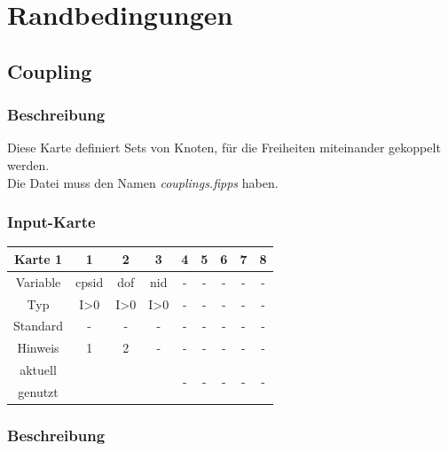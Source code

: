 \documentclass[11pt,titlepage,listof=totoc,bibliography=totoc,twoside]{scrreprt}
\begin{document}
{{\newpage

\section{Randbedingungen}

\subsection{Coupling}

\subsubsection{Beschreibung}

Diese Karte definiert Sets von Knoten, für die Freiheiten miteinander gekoppelt werden.\\
Die Datei muss den Namen \emph{couplings.fipps} haben.

\subsubsection{Input-Karte}

\begin{table}[htbp]
\centering
\begin{tabularx}{\textwidth}{cCCCCCCCC}
\toprule
Karte 1	& 1		& 2		& 3		& 4		& 5		& 6		& 7		& 8		\\
\midrule
Variable& cpsid		& dof		& nid		& -		& -		& -		& -		& -		\\
Typ	& I>0		& I>0		& I>0		& -		& -		& -		& -		& -		\\
Standard& -		& -		& -		& -		& -		& -		& -		& -		\\
Hinweis	& 1		& 2		& -		& -		& -		& -		& -		& -		\\
aktuell	& 	& 	& 	& 	& 	& \multirow{2}{*}{-}	& 	& 	\\
genutzt \\
\bottomrule
\end{tabularx}
\end{table}

\subsubsection{Beschreibung}

}}
\end{document}
